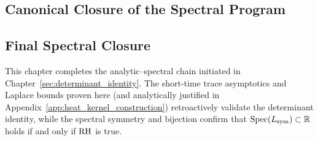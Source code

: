 








\subsection{Canonical Closure of the Spectral Program}
\label{sec:canonical_closure}




\subsection{Final Spectral Closure}
\label{sec:spectral_final_closure}






\begin{remark}
This chapter completes the analytic–spectral chain initiated in Chapter~\ref{sec:determinant_identity}. The short-time trace asymptotics and Laplace bounds proven here (and analytically justified in Appendix~\ref{app:heat_kernel_construction}) retroactively validate the determinant identity, while the spectral symmetry and bijection confirm that $\operatorname{Spec}(L_{\mathrm{sym}}) \subset \mathbb{R}$ holds if and only if $\mathrm{RH}$ is true.
\end{remark}
